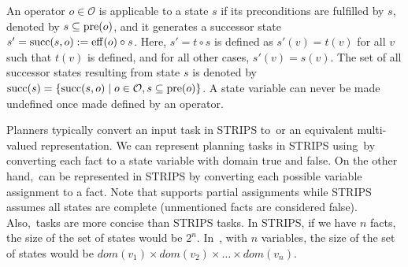 \documentclass[ppgc,diss,english]{iiufrgs}
\begin{document}
An operator $o \in \mathcal{O}$ is applicable to a state $s$ if its preconditions are fulfilled by $s$, denoted by $s \subseteq \operatorname{pre}(o)$, and it generates a successor state $s'=\operatorname{succ}(s,o):=\operatorname{eff}(o)\circ s$. Here, $s'=t\circ s$ is defined as $s'(v)=t(v)$ for all $v$ such that $t(v)$ is defined, and for all other cases, $s'(v)=s(v)$. The set of all successor states resulting from state $s$ is denoted by $\operatorname{succ}(s)=\{{\operatorname{succ}(s,o)\mid o\in \mathcal{O}, s \subseteq \operatorname{pre}(o)}\}$. A state variable can never be made undefined once made defined by an operator.

Planners typically convert an input task in STRIPS to~\sas or an equivalent multi-valued representation. We can represent planning tasks in STRIPS using~\sas by converting each fact to a state variable with domain true and false. On the other hand,~\sas can be represented in STRIPS by converting each possible variable assignment to a fact. Note that \sas supports partial assignments while STRIPS assumes all states are complete (unmentioned facts are considered false).
Also,~\sas tasks are more concise than STRIPS tasks. In STRIPS, if we have $n$ facts, the size of the set of states would be $2^n$. In~\sas, with $n$ variables, the size of the set of states would be $dom(v_{1}) \times dom(v_{2}) \times \ldots \times dom(v_{n})$.

\end{document}
